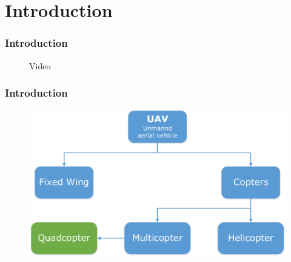 \section{Introduction}

\begin{frame}
\frametitle{Introduction}
\begin{figure}[H]
  \begin{center}
  Video
  \end{center}
\end{figure}

\end{frame}




\begin{frame}
\frametitle{Introduction}
\begin{figure}[H]
  \begin{center}
  \includegraphics[scale=0.]{fig/uav_groups.pdf}
  \end{center}
\end{figure}

\end{frame}




